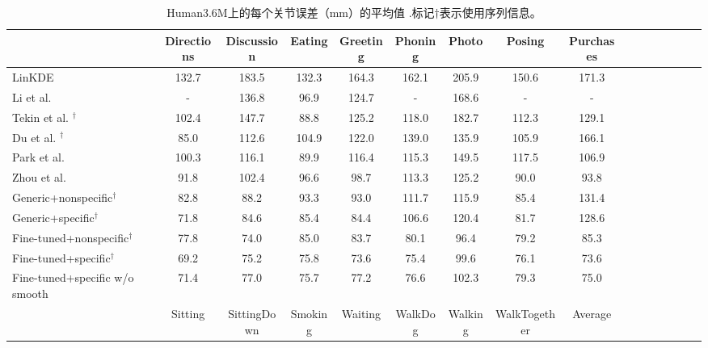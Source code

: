 \begin{table}
\footnotesize
\caption{Human3.6M上的每个关节误差（mm）的平均值 \cite{ionescu2014human}.标记$\dagger$表示使用序列信息。}
\centering
\renewcommand{\arraystretch}{0.5}
\renewcommand{\tabcolsep}{0.1 mm}
\begin{tabular}{l*{15}{c}}
\toprule
 & Directions & Discussion & Eating & Greeting & Phoning & Photo & Posing & Purchases \\
\toprule
LinKDE \cite{ionescu2014human} & 132.7 & 183.5 & 132.3 & 164.3 & 162.1 & 205.9 & 150.6 & 171.3 \\
Li et al. \cite{li2015} & - & 136.8 & 96.9 & 124.7 & - & 168.6 & - & - \\
Tekin et al. \cite{tekin2015}$^\dagger$ & 102.4 & 147.7 & 88.8 & 125.2 & 118.0 & 182.7 & 112.3 & 129.1 \\
Du et al. \cite{du2016marker}$^\dagger$  &        85.0 &       112.6 &        104.9 &        122.0 &        139.0 &        135.9 &        105.9 &        166.1 \\
Park et al. \cite{park20163d}  &         100.3 &        116.1 &        89.9 &        116.4 &        115.3 &        149.5 & 117.5 &        106.9 \\
Zhou et al. \cite{zhou2016deep}  &        91.8 &        102.4 &        96.6 &        98.7 &        113.3 &        125.2 &       90.0 &        93.8 \\
Generic+nonspecific$^\dagger$ & 82.8 &         88.2 &         93.3 &         93.0 &        111.7 &        115.9 &         85.4 &        131.4 \\
Generic+specific$^\dagger$ & 71.8 &         84.6 &         85.4 &         84.4 &        106.6 &        120.4 &         81.7 &        128.6 \\
Fine-tuned+nonspecific$^\dagger$ & 77.8 &         74.0 &         85.0 &         83.7 &         80.1 &         96.4 &         79.2 &         85.3 \\
Fine-tuned+specific$^\dagger$ & 69.2 &         75.2 &         75.8 &         73.6 &         75.4 &         99.6 &         76.1 &         73.6 \\
Fine-tuned+specific w/o smooth & 71.4 &         77.0 &         75.7 &         77.2 &         76.6 &        102.3 &         79.3 &         75.0 \\
\toprule
 & Sitting & SittingDown & Smoking & Waiting & WalkDog & Walking & WalkTogether & Average \\

\end{tabular}
\end{table}
